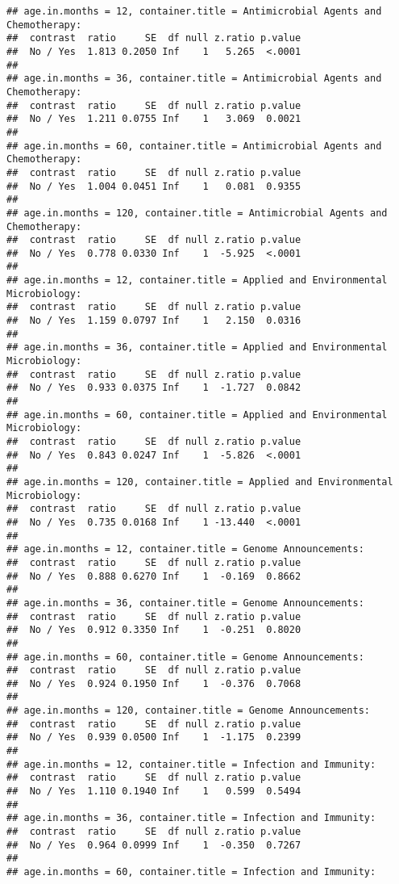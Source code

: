 \documentclass[
]{article}
\begin{document}
\begin{verbatim}
## age.in.months = 12, container.title = Antimicrobial Agents and Chemotherapy:
##  contrast  ratio     SE  df null z.ratio p.value
##  No / Yes  1.813 0.2050 Inf    1   5.265  <.0001
## 
## age.in.months = 36, container.title = Antimicrobial Agents and Chemotherapy:
##  contrast  ratio     SE  df null z.ratio p.value
##  No / Yes  1.211 0.0755 Inf    1   3.069  0.0021
## 
## age.in.months = 60, container.title = Antimicrobial Agents and Chemotherapy:
##  contrast  ratio     SE  df null z.ratio p.value
##  No / Yes  1.004 0.0451 Inf    1   0.081  0.9355
## 
## age.in.months = 120, container.title = Antimicrobial Agents and Chemotherapy:
##  contrast  ratio     SE  df null z.ratio p.value
##  No / Yes  0.778 0.0330 Inf    1  -5.925  <.0001
## 
## age.in.months = 12, container.title = Applied and Environmental Microbiology:
##  contrast  ratio     SE  df null z.ratio p.value
##  No / Yes  1.159 0.0797 Inf    1   2.150  0.0316
## 
## age.in.months = 36, container.title = Applied and Environmental Microbiology:
##  contrast  ratio     SE  df null z.ratio p.value
##  No / Yes  0.933 0.0375 Inf    1  -1.727  0.0842
## 
## age.in.months = 60, container.title = Applied and Environmental Microbiology:
##  contrast  ratio     SE  df null z.ratio p.value
##  No / Yes  0.843 0.0247 Inf    1  -5.826  <.0001
## 
## age.in.months = 120, container.title = Applied and Environmental Microbiology:
##  contrast  ratio     SE  df null z.ratio p.value
##  No / Yes  0.735 0.0168 Inf    1 -13.440  <.0001
## 
## age.in.months = 12, container.title = Genome Announcements:
##  contrast  ratio     SE  df null z.ratio p.value
##  No / Yes  0.888 0.6270 Inf    1  -0.169  0.8662
## 
## age.in.months = 36, container.title = Genome Announcements:
##  contrast  ratio     SE  df null z.ratio p.value
##  No / Yes  0.912 0.3350 Inf    1  -0.251  0.8020
## 
## age.in.months = 60, container.title = Genome Announcements:
##  contrast  ratio     SE  df null z.ratio p.value
##  No / Yes  0.924 0.1950 Inf    1  -0.376  0.7068
## 
## age.in.months = 120, container.title = Genome Announcements:
##  contrast  ratio     SE  df null z.ratio p.value
##  No / Yes  0.939 0.0500 Inf    1  -1.175  0.2399
## 
## age.in.months = 12, container.title = Infection and Immunity:
##  contrast  ratio     SE  df null z.ratio p.value
##  No / Yes  1.110 0.1940 Inf    1   0.599  0.5494
## 
## age.in.months = 36, container.title = Infection and Immunity:
##  contrast  ratio     SE  df null z.ratio p.value
##  No / Yes  0.964 0.0999 Inf    1  -0.350  0.7267
## 
## age.in.months = 60, container.title = Infection and Immunity:

\end{verbatim}
\end{document}
